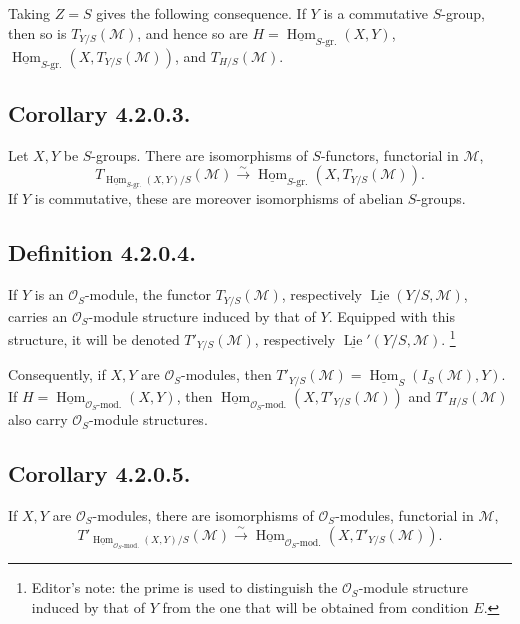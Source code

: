 Taking \(Z=S\) gives the following consequence. If \(Y\) is a
commutative \(S\)-group, then so is \(T_{Y/S}(\mathcal M)\), and hence
so are
\(H=\underline{\operatorname{Hom}}_{S\text{-gr.}}(X,Y)\),
\(\underline{\operatorname{Hom}}_{S\text{-gr.}}
(X,T_{Y/S}(\mathcal M))\), and \(T_{H/S}(\mathcal M)\).

\subsection*{Corollary 4.2.0.3.}
Let \(X,Y\) be \(S\)-groups. There are isomorphisms of \(S\)-functors,
functorial in \(\mathcal M\),
\[
 T_{\underline{\operatorname{Hom}}_{S\text{-gr.}}(X,Y)/S}
   (\mathcal M)
 \xrightarrow{\sim}
 \underline{\operatorname{Hom}}_{S\text{-gr.}}
   (X,T_{Y/S}(\mathcal M)).
\]
If \(Y\) is commutative, these are moreover isomorphisms of abelian
\(S\)-groups.

\subsection*{Definition 4.2.0.4.}
If \(Y\) is an \(\mathcal O_S\)-module, the functor
\(T_{Y/S}(\mathcal M)\), respectively
\(\underline{\operatorname{Lie}}(Y/S,\mathcal M)\), carries an
\(\mathcal O_S\)-module structure induced by that of \(Y\). Equipped
with this structure, it will be denoted
\(T'_{Y/S}(\mathcal M)\), respectively
\(\underline{\operatorname{Lie}}'(Y/S,\mathcal M)\).
\footnote{Editor's note: the prime is used to distinguish the
\(\mathcal O_S\)-module structure induced by that of \(Y\) from the one
that will be obtained from condition \(E\).}

Consequently, if \(X,Y\) are \(\mathcal O_S\)-modules, then
\(T'_{Y/S}(\mathcal M)=
\underline{\operatorname{Hom}}_S(I_S(\mathcal M),Y)\). If
\(H=\underline{\operatorname{Hom}}_{\mathcal O_S\text{-mod.}}(X,Y)\),
then
\(\underline{\operatorname{Hom}}_{\mathcal O_S\text{-mod.}}
(X,T'_{Y/S}(\mathcal M))\) and \(T'_{H/S}(\mathcal M)\) also carry
\(\mathcal O_S\)-module structures.

\subsection*{Corollary 4.2.0.5.}
If \(X,Y\) are \(\mathcal O_S\)-modules, there are isomorphisms of
\(\mathcal O_S\)-modules, functorial in \(\mathcal M\),
\[
 T'_{\underline{\operatorname{Hom}}_{\mathcal O_S\text{-mod.}}(X,Y)/S}
   (\mathcal M)
 \xrightarrow{\sim}
 \underline{\operatorname{Hom}}_{\mathcal O_S\text{-mod.}}
   (X,T'_{Y/S}(\mathcal M)).
\]

